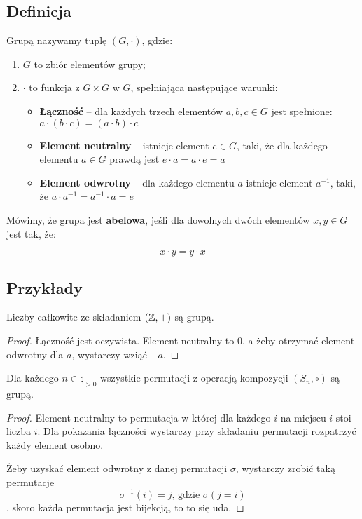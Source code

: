 \subsection{Definicja}
\begin{definition}
	Grupą nazywamy tuplę \((G, \cdot)\), gdzie:

	\begin{enumerate}
		\item \(G\) to zbiór elementów grupy;
		\item \(\cdot\) to funkcja z \(G \times G\) w \(G\), spełniająca następujące warunki:
		      \begin{itemize}
			      \item \textbf{Łączność} -- dla każdych trzech elementów \(a, b, c \in G\) jest spełnione: \(a\cdot(b\cdot c) = (a\cdot b)\cdot c\)
			      \item \textbf{Element neutralny} -- istnieje element \(e \in G\), taki, że dla każdego elementu \(a \in G\) prawdą jest \(e\cdot a = a\cdot e = a\)
			      \item \textbf{Element odwrotny} -- dla każdego elementu \(a\) istnieje element \(a^{-1}\), taki, że \(a \cdot a^{-1} = a^{-1} \cdot a = e\)
		      \end{itemize}
	\end{enumerate}

\end{definition}

\begin{definition}
	Mówimy, że grupa jest \textbf{abelowa}, jeśli dla dowolnych dwóch elementów \(x, y \in G\) jest tak, że:

	\[
		x \cdot y = y \cdot x
	\]
\end{definition}

\subsection{Przykłady}
\begin{lemma}
	Liczby całkowite ze składaniem \((\mathbb{Z}, +)\) są grupą.
\end{lemma}
\begin{proof}
	Łączność jest oczywista. Element neutralny to \(0\), a żeby otrzymać element odwrotny dla \(a\), wystarczy wziąć \(-a\).
\end{proof}

\begin{lemma}
	Dla każdego \(n \in \natural_{>0}\) wszystkie permutacji z operacją kompozycji \((S_n, \circ)\) są grupą.
\end{lemma}
\begin{proof}
	Element neutralny to permutacja w której dla każdego \(i\) na miejscu \(i\) stoi liczba \(i\). Dla pokazania łączności wystarczy przy składaniu permutacji rozpatrzyć każdy element osobno.

	Żeby uzyskać element odwrotny z danej permutacji \(\sigma\), wystarczy zrobić taką permutacje \[
		\sigma^{-1}(i) = j\text{, gdzie } \sigma(j = i)
	\],
	skoro każda permutacja jest bijekcją, to to się uda.
\end{proof}

